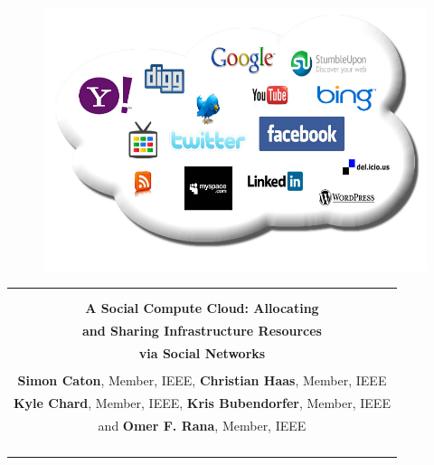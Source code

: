 \documentclass[a4paper,12pt]{article}
\begin{document}
    \begin{center}

        \begin{figure}[htp]
        \begin{center}
        \includegraphics[scale=0.25]{jpg/The-Cloud.jpg}
        \end{center}
        \end{figure}

        \begin{tabular}{c}
            \hline
            \hline
            \\ \\
 	{\LARGE\textbf{A Social Compute Cloud: Allocating}}\\
            {\LARGE\textbf{and Sharing Infrastructure Resources}}\\
	 {\LARGE\textbf{ via Social Networks}}\\
            \\
            \textbf{Simon Caton}, Member, IEEE,  \textbf{Christian Haas}, Member, IEEE\\
	  \textbf{ Kyle Chard}, Member, IEEE,  \textbf{Kris Bubendorfer}, Member, IEEE\\
 	   and  \textbf{ Omer F. Rana}, Member, IEEE\\
            \\ \\
            \hline
	\hline
            \\ \\
        \end{tabular}

    \end{center}
\end{document}
